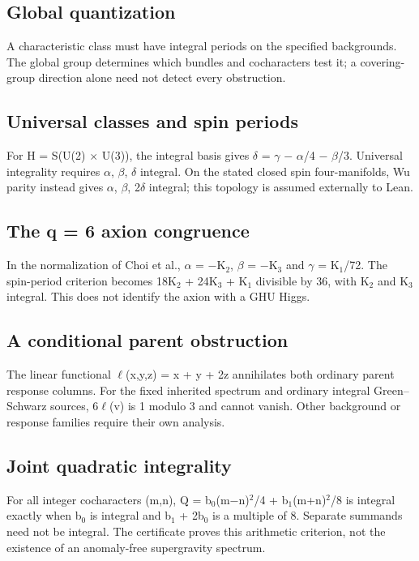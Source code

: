 \documentclass[11pt,a4paper]{article}
\begin{document}
\subsection*{Global quantization}
A characteristic class must have integral periods on the specified backgrounds. The global group determines which bundles and cocharacters test it; a covering-group direction alone need not detect every obstruction.

\subsection*{Universal classes and spin periods}
For H = S(U(2) \ensuremath{\times} U(3)), the integral basis gives \ensuremath{\delta} = \ensuremath{\gamma} \ensuremath{-} \ensuremath{\alpha}/4 \ensuremath{-} \ensuremath{\beta}/3. Universal integrality requires \ensuremath{\alpha}, \ensuremath{\beta}, \ensuremath{\delta} integral. On the stated closed spin four-manifolds, Wu parity instead gives \ensuremath{\alpha}, \ensuremath{\beta}, 2\ensuremath{\delta} integral; this topology is assumed externally to Lean.

\subsection*{The q = 6 axion congruence}
In the normalization of Choi et al., \ensuremath{\alpha} = \ensuremath{-}K\ensuremath{{}_{2}}, \ensuremath{\beta} = \ensuremath{-}K\ensuremath{{}_{3}} and \ensuremath{\gamma} = K\ensuremath{{}_{1}}/72. The spin-period criterion becomes 18K\ensuremath{{}_{2}} + 24K\ensuremath{{}_{3}} + K\ensuremath{{}_{1}} divisible by 36, with K\ensuremath{{}_{2}} and K\ensuremath{{}_{3}} integral. This does not identify the axion with a GHU Higgs.

\subsection*{A conditional parent obstruction}
The linear functional \ensuremath{\ell}(x,y,z) = x + y + 2z annihilates both ordinary parent response columns. For the fixed inherited spectrum and ordinary integral Green--Schwarz sources, 6\ensuremath{\ell}(v) is 1 modulo 3 and cannot vanish. Other background or response families require their own analysis.

\subsection*{Joint quadratic integrality}
For all integer cocharacters (m,n), Q = b\ensuremath{{}_{0}}(m\ensuremath{-}n)\ensuremath{{}^{2}}/4 + b\ensuremath{{}_{1}}(m+n)\ensuremath{{}^{2}}/8 is integral exactly when b\ensuremath{{}_{0}} is integral and b\ensuremath{{}_{1}} + 2b\ensuremath{{}_{0}} is a multiple of 8. Separate summands need not be integral. The certificate proves this arithmetic criterion, not the existence of an anomaly-free supergravity spectrum.
\end{document}
